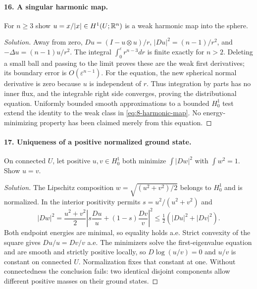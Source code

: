 \Needspace{30mm}
\paragraph{16. A singular harmonic map.}
For $n\geq3$ show $u=x/|x|\in H^1(U;\mathbb{R}^n)$ is a weak harmonic map into the sphere.
\begin{proof}[Solution]
Away from zero,
$Du=(I-u\otimes u)/r$, $|Du|^2=(n-1)/r^2$, and
$-\Delta u=(n-1)u/r^2$. The integral
$\int_0^\varepsilon r^{n-3}dr$ is finite exactly for $n>2$.
Deleting a small ball and passing to the limit proves these are the weak
first derivatives; its boundary error is $O(\varepsilon^{n-1})$.
For the equation, the new spherical normal derivative is zero because
$u$ is independent of $r$. Thus integration by parts has no inner flux,
and the integrable right side converges, proving the distributional equation.
Uniformly bounded smooth approximations to a bounded $H^1_0$ test extend
the identity to the weak class in \eqref{eq:8-harmonic-map}.
No energy-minimizing property has been claimed merely from this equation.
\end{proof}

\Needspace{30mm}
\paragraph{17. Uniqueness of a positive normalized ground state.}
On connected $U$, let positive $u,v\in H^1_0$ both minimize
$\int|Dw|^2$ with $\int w^2=1$. Show $u=v$.
\begin{proof}[Solution]
The Lipschitz composition $w=\sqrt{(u^2+v^2)/2}$ belongs to $H^1_0$
and is normalized. In the interior positivity permits
$s=u^2/(u^2+v^2)$ and
\[
 |Dw|^2=\frac{u^2+v^2}{2}
 \left|s\frac{Du}{u}+(1-s)\frac{Dv}{v}\right|^2
 \leq\tfrac12(|Du|^2+|Dv|^2).
\]
Both endpoint energies are minimal, so equality holds a.e.
Strict convexity of the square gives $Du/u=Dv/v$ a.e.
The minimizers solve the first-eigenvalue equation and are smooth and
strictly positive locally, so $D\log(u/v)=0$ and $u/v$ is constant on
connected $U$. Normalization fixes that constant at one.
Without connectedness the conclusion fails: two identical disjoint
components allow different positive masses on their ground states.
\end{proof}
\Needspace{55mm}

\Needspace{30mm}
